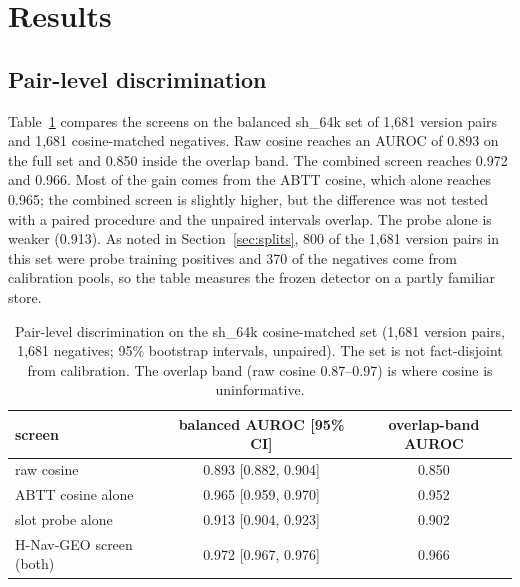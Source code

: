 \documentclass[journal=jcisd8,manuscript=article]{achemso}
\newcommand{\sub}[1]{\textsf{sh\_#1}}                    %
\newcommand{\geo}{H-Nav-GEO}
\begin{document}
\section{Results}
\label{sec:results}

\subsection{Pair-level discrimination}
\label{sec:pairlevel}

Table~\ref{tab:pairlevel} compares the screens on the balanced \sub{64k} set of 1,681 version pairs and 1,681 cosine-matched negatives. Raw cosine reaches an AUROC of 0.893 on the full set and 0.850 inside the overlap band. The combined screen reaches 0.972 and 0.966. Most of the gain comes from the ABTT cosine, which alone reaches 0.965; the combined screen is slightly higher, but the difference was not tested with a paired procedure and the unpaired intervals overlap. The probe alone is weaker (0.913). As noted in Section~\ref{sec:splits}, 800 of the 1,681 version pairs in this set were probe training positives and 370 of the negatives come from calibration pools, so the table measures the frozen detector on a partly familiar store.

\begin{table}[H]\centering
\caption{Pair-level discrimination on the \sub{64k} cosine-matched set (1,681 version pairs, 1,681 negatives; 95\% bootstrap intervals, unpaired). The set is not fact-disjoint from calibration. The overlap band (raw cosine 0.87--0.97) is where cosine is uninformative.}
\label{tab:pairlevel}
\begin{tabular}{lcc}\toprule
screen & balanced AUROC [95\% CI] & overlap-band AUROC\\\midrule
raw cosine & 0.893 [0.882, 0.904] & 0.850\\
ABTT cosine alone & 0.965 [0.959, 0.970] & 0.952\\
slot probe alone & 0.913 [0.904, 0.923] & 0.902\\
\geo{} screen (both) & 0.972 [0.967, 0.976] & 0.966\\\bottomrule
\end{tabular}\end{table}
\end{document}
